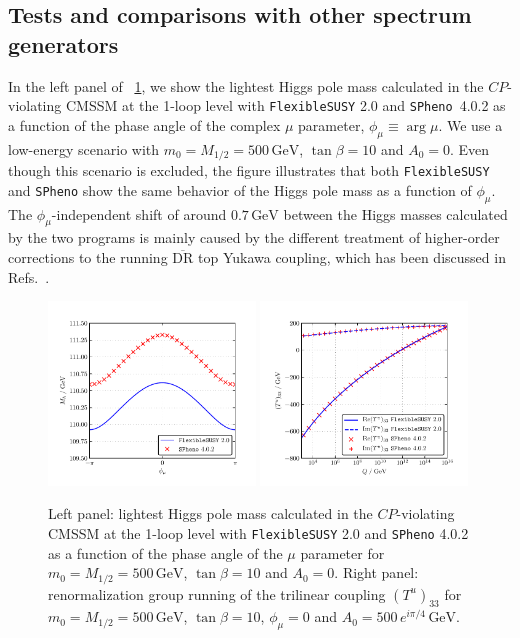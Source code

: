 \documentclass[final,3p,11pt,pdflatex]{elsarticle}
\makeatletter
\newcommand{\spheno}{\texttt{SPheno}\@\xspace}
\newcommand{\fs}{\texttt{FlexibleSUSY}\@\xspace}
\newcommand{\fstwo}{\fs 2.0\@\xspace}
\newcommand{\ol}[1]{\overline{#1}}
\newcommand{\DRbar}{\ensuremath{\ol{\text{DR}}}\xspace}
\newcommand{\unit}[1]{\,\text{#1}}      %
\newcommand{\figref}[1]{\figurename~\ref{#1}}
\newcommand{\CP}{\ensuremath{CP}\xspace}
\newcommand{\azero}{\ensuremath{A_0}\xspace}
\newcommand{\mhalf}{\ensuremath{M_{1/2}}\xspace}
\newcommand{\mzero}{\ensuremath{m_0}\xspace}
\makeatother
\begin{document}
\subsection{Tests and comparisons with other spectrum generators}
%
In the left panel of \figref{fig:CMSSMCPV_plots}, we show the lightest
Higgs pole mass calculated in the \CP-violating CMSSM at the 1-loop
level with \fstwo and \spheno~4.0.2 as a function of the phase angle
of the complex $\mu$ parameter, $\phi_\mu \equiv \arg \mu$.
We use a low-energy scenario with $\mzero = \mhalf = 500\unit{GeV}$,
$\tan\beta = 10$ and $\azero = 0$.  Even though this scenario is
excluded, the figure illustrates that both \fs and \spheno show the
same behavior of the Higgs pole mass as a function of $\phi_\mu$.
The $\phi_\mu$-independent shift of around $0.7\unit{GeV}$ between the
Higgs masses calculated by the two programs is mainly caused by the
different treatment of higher-order corrections to
the running \DRbar top Yukawa coupling, which has been discussed in
Refs.~\cite{Staub:2015aea,ThomasKwasnitza:2016yqj}.
%
\begin{figure}[tbh]
  \centering
  \includegraphics[width=0.49\textwidth]{plots/CMSSMCPV/scan_Mh_PhiMu_m0-500_M12-500_TB-10_A0-0}\hfill
  \includegraphics[width=0.49\textwidth]{plots/CMSSMCPV/scan_TYu33_Q_m0-500_M12-500_TB-10_A0-500_PhiMu-0_PhiA0-Pi4}
  \caption{Left panel: lightest Higgs pole mass calculated in the
    \CP-violating CMSSM at the 1-loop level with \fstwo and
    \spheno 4.0.2 as a function of the phase angle of the $\mu$
    parameter for $\mzero = \mhalf = 500\unit{GeV}$, $\tan\beta = 10$
    and $\azero = 0$.  Right panel: renormalization group running of the
    trilinear coupling $(T^u)_{33}$ for $\mzero = \mhalf =
    500\unit{GeV}$, $\tan\beta = 10$, $\phi_\mu = 0$ and $\azero = 500\,
    e^{i \pi/4} \unit{GeV}$.}
  \label{fig:CMSSMCPV_plots}
\end{figure}
\end{document}
